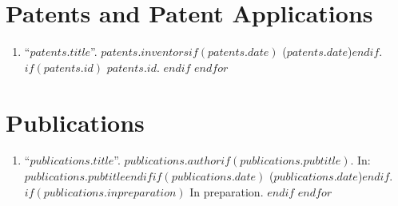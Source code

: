 \documentclass[10pt,twocolumn]{article}
\begin{document}
\section*{Patents and Patent Applications}
\begin{enumerate}
$for(patents)$
\item ``$patents.title$''. $patents.inventors$$if(patents.date)$ ($patents.date$)$endif$.
$if(patents.id)$
$patents.id$.
$endif$
$endfor$
\end{enumerate}

\section*{Publications}
\begin{enumerate}
$for(publications)$
\item ``\href{$publications.link$}{$publications.title$}''. $publications.author$$if(publications.pubtitle)$. In: \emph{$publications.pubtitle$}$endif$$if(publications.date)$ ($publications.date$)$endif$.
$if(publications.inpreparation)$
In preparation.
$endif$
$endfor$
\end{enumerate}
\end{document}
